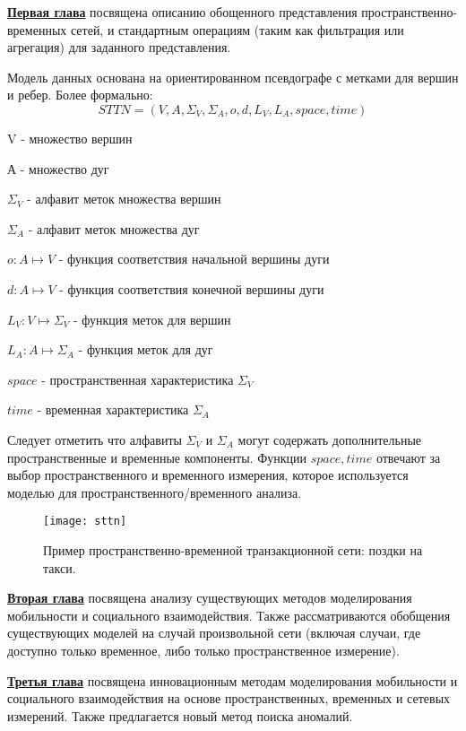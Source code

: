 \underline{\textbf{Первая глава}} посвящена описанию обощенного представления пространственно-временных сетей, и стандартным операциям (таким как фильтрация или агрегация) для заданного представления.

Модель данных основана на ориентированном псевдографе с метками для вершин и ребер. Более формально: 
\begin{equation}
\label{eq:sttn} {
STTN = (V, A, \Sigma_V, \Sigma_A, o, d, L_V, L_A, space, time)
}
\end{equation}

V - множество вершин

А - множество дуг

$\Sigma_V$ - алфавит меток множества вершин

$\Sigma_A$ - алфавит меток множества дуг

$o: A \mapsto V$ - функция соответствия начальной вершины дуги

$d: A \mapsto V$ - функция соответствия конечной вершины дуги

$L_V: V \mapsto \Sigma_V$ - функция меток для вершин

$L_A: A \mapsto \Sigma_A$ - функция меток для дуг

$space$ - пространственная характеристика $\Sigma_V$

$time$ - временная характеристика $\Sigma_A$


Следует отметить что алфавиты $\Sigma_V$ и $\Sigma_A$ могут содержать дополнительные пространственные и временные компоненты. Функции $space, time$ отвечают за выбор пространственного и временного измерения, которое  используется моделью для пространственного/временного анализа.   

\begin{figure}[ht]
        \texttt{[image: sttn]}
    \caption{Пример пространственно-временной транзакционной сети: поздки на такси.}
\end{figure}

\underline{\textbf{Вторая глава}} посвящена анализу существующих методов моделирования мобильности и социального взаимодействия. Также рассматриваются обобщения существующих моделей на случай произвольной сети (включая случаи, где доступно только временное, либо только пространственное измерение).

\underline{\textbf{Третья глава}} посвящена инновационным методам моделирования мобильности и социального взаимодействия на основе пространственных, временных и сетевых измерений. Также предлагается новый метод поиска аномалий.

